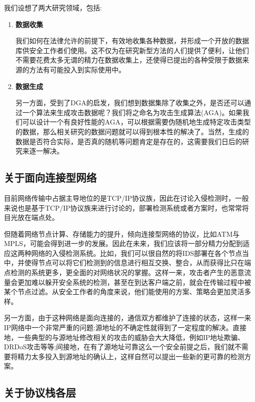 \documentclass[12pt]{article} %
\begin{document}
我们设想了两大研究领域，包括:

\begin{enumerate}
	\item \textbf{数据收集}

	我们如何在法律允许的前提下，有效地收集各种数据，并形成一个开放的数据库供安全工作者们使用。这不仅为在研究新型方法的人们提供了便利，让他们不需要花费太多无谓的精力在数据收集上，还使得已提出的各种受限于数据来源的方法有可能投入到实际使用中。

	\item \textbf{数据生成}

	另一方面，受到了DGA的启发，我们想到数据集除了收集之外，是否还可以通过一个算法来生成攻击数据呢？我们将之命名为攻击生成算法(AGA)。如果我们可以设计一个有良好性能的AGA，可以根据需要伪随机地生成特定攻击类型的数据，那么相关研究的数据问题就可以得到根本性的解决了。当然，生成的数据是否符合实际，是否真的随机等问题肯定是存在的，这需要我们日后的研究来逐一解决。
\end{enumerate}

\subsection{关于面向连接型网络}
\label{connect}

目前网络传输中占据主导地位的是TCP/IP协议族，因此在讨论入侵检测时，一般来说也是基于TCP/IP协议族来进行讨论的，部署检测系统或者方案时，也常常将目光放在端点处。

但随着网络节点计算、存储能力的提升，倾向连接型网络的协议，比如ATM与MPLS，可能会得到进一步的发展。因此在未来，我们应该将一部分精力分配到适应这两种网络的入侵检测系统。比如，我们可以很自然的将IDS部署在各个节点当中，并使得节点可以将它们检测到的信息进行相互交换、整合，从而获得比只在端点检测的系统更多，更全面的对网络状况的掌握。这样一来，攻击者产生的恶意流量会更加难以躲开安全系统的检测，甚至在到达客户端之前，就会在传输过程中被某个节点过滤。从安全工作者的角度来说，他们能使用的方案、策略会更加灵活多样。 %

另一方面，由于这种网络是面向连接的，通信双方都维护了连接的状态，这样一来IP网络中一个非常严重的问题:源地址的不确定性就得到了一定程度的解决。直接地，一些典型的与源地址修改相关的攻击的威胁会大大降低，例如IP地址欺骗、DRDoS攻击等等;间接地，在有了源地址可靠这么一个安全前提之后，我们就不需要将精力太多投入到源地址的确认上，这样自然可以提出一些新的更可靠的检测方案。 %

\subsection{关于协议栈各层}
\label{layer}
\end{document}
